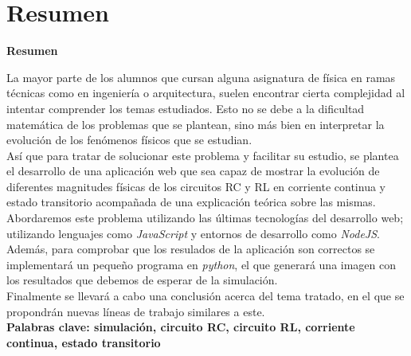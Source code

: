 \documentclass[../main.tex]{subfiles}
\begin{document}
\makeatletter
\renewenvironment{abstract}{%
    \if@twocolumn
      \section*{Resumen \\}%
    \else %
    \begin{flushright}
        {\filleft\Huge\bfseries\fontsize{48pt}{12}\selectfont Resumen\vspace{\z@}}%
        \end{flushright}
      \quotation
    \fi}
    {\if@twocolumn\else\endquotation\fi}
\makeatother
\makeatletter
\renewenvironment{abstract}{%
    \if@twocolumn
      \section*{Resumen \\}%
    \else %
    \begin{flushright}
        {\filleft\Huge\bfseries\fontsize{48pt}{12}\selectfont Resumen\vspace{\z@}}%
        \end{flushright}
      \quotation
    \fi}
    {\if@twocolumn\else\endquotation\fi}
\makeatother
\begin{abstract}
La mayor parte de los alumnos que cursan alguna asignatura de física en ramas técnicas como en ingeniería o arquitectura, suelen encontrar cierta complejidad al intentar comprender los temas estudiados. Esto no se debe a la dificultad matemática de los problemas que se plantean, sino más bien en interpretar la evolución de los fenómenos físicos que se estudian.\\ 

Así que para tratar de solucionar este problema y facilitar su estudio, se plantea el desarrollo de una aplicación web que sea capaz de mostrar la evolución de diferentes magnitudes físicas de los circuitos RC y RL en corriente continua y estado transitorio acompañada de una explicación teórica sobre las mismas.\\

Abordaremos este problema utilizando las últimas tecnologías del desarrollo web; utilizando lenguajes como \textit{JavaScript} y entornos de desarrollo como \textit{NodeJS}. Además, para comprobar que los resulados de la aplicación son correctos se implementará un pequeño programa en \textit{python}, el que generará una imagen con los resultados que debemos de esperar de la simulación. \\

Finalmente se llevará a cabo una conclusión acerca del tema tratado, en el que se propondrán nuevas líneas de trabajo similares a este.\\

\bfseries{\large{Palabras clave:}} simulación, circuito RC, circuito RL, corriente continua, estado transitorio

\end{abstract}
\end{document}
